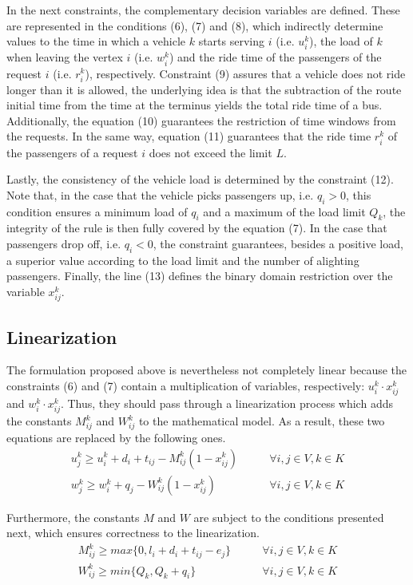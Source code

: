\documentclass[tuberlin,cic,tc,openright,english,noabntcite,oneside]{iiufrgs}
\begin{document}
In the next constraints, the complementary decision variables are defined. These are represented in the conditions (6), (7) and (8), which indirectly determine values to the time in which a vehicle $k$ starts serving $i$ (i.e. $u_i^k$), the load of $k$ when leaving the vertex $i$ (i.e. $w_i^k$) and the ride time of the passengers of the request $i$ (i.e. $r_i^k$), respectively. Constraint (9) assures that a vehicle does not ride longer than it is allowed, the underlying idea is that the subtraction of the route initial time from the time at the terminus yields the total ride time of a bus. Additionally, the equation (10) guarantees the restriction of time windows from the requests. In the same way, equation (11) guarantees that the ride time $r_i^k$ of the passengers of a request $i$ does not exceed the limit $L$.

Lastly, the consistency of the vehicle load is determined by the constraint (12). Note that, in the case that the vehicle picks passengers up, i.e. $q_i > 0$, this condition ensures a minimum load of $q_i$ and a maximum of the load limit $Q_k$, the integrity of the rule is then fully covered by the equation (7). In the case that passengers drop off, i.e. $q_i < 0$, the constraint guarantees, besides a positive load, a superior value according to the load limit and the number of alighting passengers. Finally, the line (13) defines the binary domain restriction over the variable $x_{ij}^k$.

\subsection{Linearization}
The formulation proposed above is nevertheless not completely linear because the constraints (6) and (7) contain a multiplication of variables, respectively: $u_i^k \cdot x_{ij}^k$ and $w_i^k \cdot x_{ij}^k$. Thus, they should pass through a linearization process which adds the constants $M_{ij}^k$ and $W_{ij}^k$ to the mathematical model. As a result, these two equations are replaced by the following ones.
\begin{align}
	u_j^k \geq u_i^k + d_i + t_{ij} - M_{ij}^k(1 - x_{ij}^k)	\qquad & \forall i,j \in V, k \in K \\
	w_j^k \geq w_i^k + q_j - W_{ij}^k(1 - x_{ij}^k)				\qquad & \forall i,j \in V, k \in K
\end{align}

Furthermore, the constants $M$ and $W$ are subject to the conditions presented next, which ensures correctness to the linearization.
\begin{align}
	M_{ij}^k \geq max\{0, l_i+d_i+t_{ij} - e_j\}	\qquad & \forall i,j \in V, k \in K \\
	W_{ij}^k \geq min\{Q_k, Q_k+q_i\}				\qquad & \forall i,j \in V, k \in K
\end{align}
\end{document}
